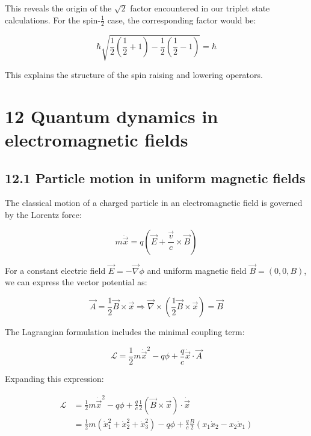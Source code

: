 \documentclass[italian]{HKNdocument}
\begin{document}
This reveals the origin of the $\sqrt{2}$ factor encountered in our triplet state calculations. For the spin-$\frac{1}{2}$ case, the corresponding factor would be:

\begin{equation*}
\hbar \sqrt{\frac{1}{2}(\frac{1}{2}+1)-\frac{1}{2}(\frac{1}{2}-1)}=\hbar \tag{11.77}
\end{equation*}

This explains the structure of the spin raising and lowering operators.

\section*{12 Quantum dynamics in electromagnetic fields}
\subsection*{12.1 Particle motion in uniform magnetic fields}
The classical motion of a charged particle in an electromagnetic field is governed by the Lorentz force:

\begin{equation*}
m \ddot{\vec{x}}=q(\vec{E}+\frac{\vec{v}}{c} \times \vec{B}) \tag{12.1}
\end{equation*}

For a constant electric field $\vec{E}=-\vec{\nabla} \phi$ and uniform magnetic field $\vec{B}=(0,0,B)$, we can express the vector potential as:

\begin{equation*}
\vec{A}=\frac{1}{2} \vec{B} \times \vec{x} \Rightarrow \vec{\nabla} \times(\frac{1}{2} \vec{B} \times \vec{x})=\vec{B} \tag{12.2}
\end{equation*}

The Lagrangian formulation includes the minimal coupling term:

\begin{equation*}
\mathcal{L}=\frac{1}{2} m \dot{\vec{x}}^{2}-q \phi+\frac{q}{c} \dot{\vec{x}} \cdot \vec{A} \tag{12.3}
\end{equation*}

Expanding this expression:

\begin{align*}
\mathcal{L} &= \frac{1}{2} m \dot{\vec{x}}^{2}-q \phi+\frac{q}{c} \frac{1}{2} (\vec{B} \times \vec{x}) \cdot \dot{\vec{x}}\\
&= \frac{1}{2} m(\dot{x}_{1}^{2}+\dot{x}_{2}^{2}+\dot{x}_{3}^{2})-q \phi+\frac{q}{c} \frac{B}{2}(x_{1} \dot{x}_{2}-x_{2}\dot{x}_{1}) \tag{12.4}
\end{align*}
\end{document}
